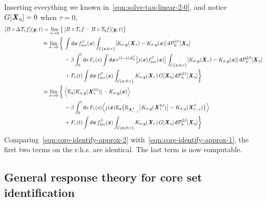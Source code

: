 \documentclass[aip,jcp,a4paper,reprint,onecolumn]{revtex4-1}
\newcommand{\vect}[1]{\textbf{\textit{#1}}}
\newcommand{\dd}{\textsf{d}}
\newcommand{\inv}{\textrm{inv}}
\newcommand{\mh}{\mathcal H}
\newcommand{\mt}{\mathcal T}
\newcommand{\mc}{\mathcal C}
\newcommand{\proj}{\mathit\Pi}
\newcommand{\fwg}{{\mathcal A}}
\begin{document}
Inserting everything we known in~\eqref{eqn:solve-tau-linear-2-0},
and notice $G[\vect X_\eta] = 0$ when $\tau = 0$,
\begin{align}\nonumber
  [\proj\circ\Delta\mt_\tau f](\vect y, t)
  =
  \lim_{\sigma \rightarrow 0}
  \big\{
  &\,
  [\proj\circ\mt_\tau f - \proj\circ\mt_0 f](\vect y, t)
  \big\}\\\nonumber
  \approx
  \lim_{\sigma \rightarrow 0}
  \bigg\{
  &\,
  \int \dd \vect x\,
  f_\inv^\beta(\vect x)
  \int_{\mc\{\vect x,0;\tau\}}
  [K_{\sigma,\vect y}(\vect X_\tau)
  -K_{\sigma,\vect y}(\vect x)]  \,
  \dd \mathcal P^{2\beta}_0[\vect X_\eta]\\\nonumber
  &\,-
  \beta
  \int_0^t\dd s\, F_e(s)
  \int \dd \vect x\,
  e^{(t-s)\fwg_0^\beta}
  \big[
  j(\vect x)
  f_\inv^\beta(\vect x)
  \big]
  \int_{\mc\{\vect x,0;\tau\}}
  [K_{\sigma,\vect y}(\vect X_\tau)
  -K_{\sigma,\vect y}(\vect x)]  \,
  \dd \mathcal P^{2\beta}_0[\vect X_\eta]\\\nonumber
  &\,+
  F_e(t)
  \int \dd \vect x\,
  f_\inv^\beta(\vect x)
  \int_{\mc\{\vect x,0;\tau\}}
  K_{\sigma,\vect y}(\vect X_\tau)
  \,G[\vect X_\eta]\,
  \dd \mathcal P^{2\beta}_0[\vect X_\eta]
  \bigg\}\\\nonumber
  \approx
  \lim_{\sigma \rightarrow 0}
  \bigg\{
  &\,
  \Big\langle
  \mathbb E_{\vect x}[K_{\sigma,\vect y}(\vect X_\tau^{2\beta})]
  -
  K_{\sigma,\vect y}(\vect x)
  \Big\rangle\\\nonumber
  &\,
  - \beta
  \int_0^t\dd s\, F_e(s)
  \Big\langle
  j(\vect x)
  \mathbb E_{\vect x} \big\{
  \mathbb E_{\vect X^\beta_{t-s}}\big[
  K_{\sigma, \vect y}(\vect X^{2\beta}_\tau)
  \big]
  -
  K_{\sigma, y}(\vect X^\beta_{t-s})
  \big\}
  \Big\rangle\\\label{eqn:core-identify-approx-2}
  &\,+
  F_e(t)
  \int \dd \vect x\,
  f_\inv^\beta(\vect x)
  \int_{\mc\{\vect x,0;\tau\}}
  K_{\sigma,\vect y}(\vect X_\tau)
  \,G[\vect X_\eta]\,
  \dd \mathcal P^{2\beta}_0[\vect X_\eta]
  \bigg\}
\end{align}
Comparing~\eqref{eqn:core-identify-approx-2}
with~\eqref{eqn:core-identify-approx-1}, the first
two terms on the r.h.s. are identical. 
The last term is now computable.


\subsection{General response theory for core set identification}
\end{document}
